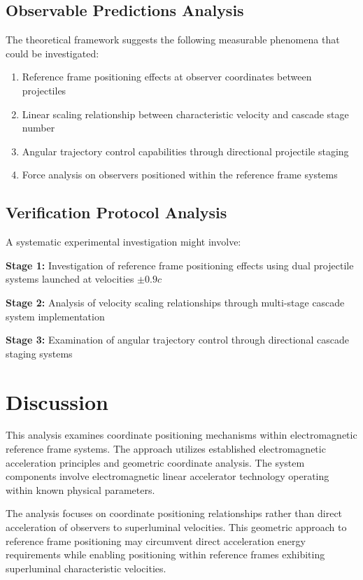\documentclass[12pt,a4paper]{article}
\begin{document}
\subsection{Observable Predictions Analysis}

The theoretical framework suggests the following measurable phenomena that could be investigated:
\begin{enumerate}
\item Reference frame positioning effects at observer coordinates between projectiles
\item Linear scaling relationship between characteristic velocity and cascade stage number
\item Angular trajectory control capabilities through directional projectile staging
\item Force analysis on observers positioned within the reference frame systems
\end{enumerate}

\subsection{Verification Protocol Analysis}

A systematic experimental investigation might involve:

\textbf{Stage 1:} Investigation of reference frame positioning effects using dual projectile systems launched at velocities $\pm 0.9c$

\textbf{Stage 2:} Analysis of velocity scaling relationships through multi-stage cascade system implementation

\textbf{Stage 3:} Examination of angular trajectory control through directional cascade staging systems

\section{Discussion}

This analysis examines coordinate positioning mechanisms within electromagnetic reference frame systems. The approach utilizes established electromagnetic acceleration principles and geometric coordinate analysis. The system components involve electromagnetic linear accelerator technology operating within known physical parameters.

The analysis focuses on coordinate positioning relationships rather than direct acceleration of observers to superluminal velocities. This geometric approach to reference frame positioning may circumvent direct acceleration energy requirements while enabling positioning within reference frames exhibiting superluminal characteristic velocities.
\end{document}
